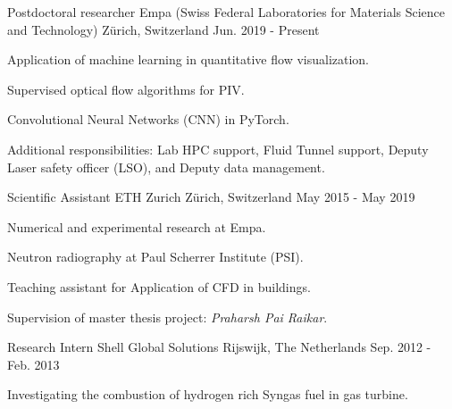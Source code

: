 \documentclass[11pt, a4paper]{preamble/awesome-cv-novo}
\begin{document}
\begin{cventries}

  \cventry
    {Postdoctoral researcher} %
    {Empa (Swiss Federal Laboratories for Materials Science and Technology)} %
    {Z\"urich, Switzerland} %
    {Jun. 2019 - Present} %
    {
      \begin{cvitems} %
        \item {Application of machine learning in quantitative flow visualization.}
        \item {Supervised optical flow algorithms for PIV.}
        \item {Convolutional Neural Networks (CNN) in PyTorch.}
        \item {Additional responsibilities: Lab HPC support, Fluid Tunnel support, Deputy Laser safety officer (LSO), and Deputy data management.}
      \end{cvitems}
    }

  \cventry
    {Scientific Assistant}
    {ETH Zurich}
    {Z\"urich, Switzerland}
    {May 2015 - May 2019}
    {
      \begin{cvitems}
        \item {Numerical and experimental research at Empa.}
        \item {Neutron radiography at Paul Scherrer Institute (PSI).}
        \item {Teaching assistant for Application of CFD in buildings.}
        \item {Supervision of master thesis project: \textit{Praharsh Pai Raikar}.}
      \end{cvitems}
    }

    \cventry
    {Research Intern}
    {Shell Global Solutions}
    {Rijswijk, The Netherlands}
    {Sep. 2012 - Feb. 2013}
    {
      \begin{cvitems}
        \item {Investigating the combustion of hydrogen rich Syngas fuel in gas turbine.}
      \end{cvitems}
    }

\end{cventries}



\end{document}
